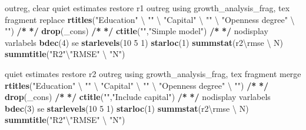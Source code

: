 \documentclass[
  12pt,
]{article}
\newenvironment{Shaded}{\begin{snugshade}}{\end{snugshade}}
\newcommand{\DecValTok}[1]{\textcolor[rgb]{0.00,0.00,0.81}{#1}}
\newcommand{\ErrorTok}[1]{\textcolor[rgb]{0.64,0.00,0.00}{\textbf{#1}}}
\newcommand{\KeywordTok}[1]{\textcolor[rgb]{0.13,0.29,0.53}{\textbf{#1}}}
\newcommand{\NormalTok}[1]{#1}
\newcommand{\OperatorTok}[1]{\textcolor[rgb]{0.81,0.36,0.00}{\textbf{#1}}}
\newcommand{\StringTok}[1]{\textcolor[rgb]{0.31,0.60,0.02}{#1}}
\begin{document}
\begin{Shaded}
\begin{Highlighting}[]
\NormalTok{outreg, clear}
\NormalTok{    quiet estimates restore r1}
\NormalTok{        outreg using growth_analysis_frag, tex fragment replace }\KeywordTok{rtitles}\NormalTok{(}\StringTok{"Education"}\NormalTok{ \textbackslash{} }\StringTok{""}\NormalTok{ \textbackslash{} }\StringTok{"Capital"}\NormalTok{ \textbackslash{} }\StringTok{""}\NormalTok{ \textbackslash{} }\StringTok{"Openness degree"}\NormalTok{ \textbackslash{} }\StringTok{""}\NormalTok{)  }\OperatorTok{/}\ErrorTok{*}
\StringTok{                }\ErrorTok{*/}\StringTok{ }\KeywordTok{drop}\NormalTok{(_cons) }\OperatorTok{/}\ErrorTok{*}
\StringTok{                }\ErrorTok{*/}\StringTok{ }\KeywordTok{ctitle}\NormalTok{(}\StringTok{""}\NormalTok{,}\StringTok{"Simple model"}\NormalTok{) }\OperatorTok{/}\ErrorTok{*}
\StringTok{                }\ErrorTok{*/}\StringTok{ }\NormalTok{nodisplay varlabels }\KeywordTok{bdec}\NormalTok{(}\DecValTok{4}\NormalTok{) se }\KeywordTok{starlevels}\NormalTok{(}\DecValTok{10} \DecValTok{5} \DecValTok{1}\NormalTok{) }\KeywordTok{starloc}\NormalTok{(}\DecValTok{1}\NormalTok{) }\KeywordTok{summstat}\NormalTok{(r2\textbackslash{}rmse \textbackslash{} N) }\KeywordTok{summtitle}\NormalTok{(}\StringTok{"R2"}\NormalTok{\textbackslash{}}\StringTok{"RMSE"}\NormalTok{ \textbackslash{} }\StringTok{"N"}\NormalTok{)}

\NormalTok{    quiet estimates restore r2}
\NormalTok{        outreg using growth_analysis_frag, tex fragment merge }\KeywordTok{rtitles}\NormalTok{(}\StringTok{"Education"}\NormalTok{ \textbackslash{} }\StringTok{""}\NormalTok{ \textbackslash{} }\StringTok{"Capital"}\NormalTok{ \textbackslash{} }\StringTok{""}\NormalTok{ \textbackslash{} }\StringTok{"Openness degree"}\NormalTok{ \textbackslash{} }\StringTok{""}\NormalTok{)  }\OperatorTok{/}\ErrorTok{*}
\StringTok{                }\ErrorTok{*/}\StringTok{ }\KeywordTok{drop}\NormalTok{(_cons) }\OperatorTok{/}\ErrorTok{*}
\StringTok{                }\ErrorTok{*/}\StringTok{ }\KeywordTok{ctitle}\NormalTok{(}\StringTok{""}\NormalTok{,}\StringTok{"Include capital"}\NormalTok{) }\OperatorTok{/}\ErrorTok{*}
\StringTok{                }\ErrorTok{*/}\StringTok{ }\NormalTok{nodisplay varlabels }\KeywordTok{bdec}\NormalTok{(}\DecValTok{3}\NormalTok{) se }\KeywordTok{starlevels}\NormalTok{(}\DecValTok{10} \DecValTok{5} \DecValTok{1}\NormalTok{) }\KeywordTok{starloc}\NormalTok{(}\DecValTok{1}\NormalTok{) }\KeywordTok{summstat}\NormalTok{(r2\textbackslash{}rmse \textbackslash{} N) }\KeywordTok{summtitle}\NormalTok{(}\StringTok{"R2"}\NormalTok{\textbackslash{}}\StringTok{"RMSE"}\NormalTok{ \textbackslash{} }\StringTok{"N"}\NormalTok{)}


\end{Highlighting}
\end{Shaded}
\end{document}

